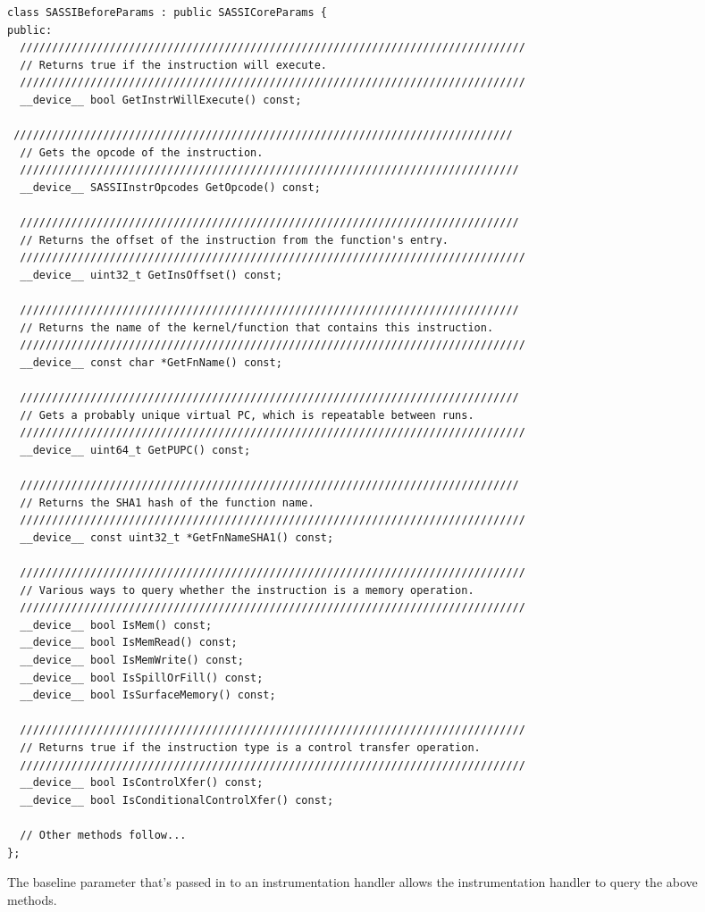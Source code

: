 \begin{figure*}
\center
\begin{lstlisting}
class SASSIBeforeParams : public SASSICoreParams {
public:
  ///////////////////////////////////////////////////////////////////////////////
  // Returns true if the instruction will execute.
  ///////////////////////////////////////////////////////////////////////////////
  __device__ bool GetInstrWillExecute() const;

 //////////////////////////////////////////////////////////////////////////////
  // Gets the opcode of the instruction.
  //////////////////////////////////////////////////////////////////////////////
  __device__ SASSIInstrOpcodes GetOpcode() const;

  //////////////////////////////////////////////////////////////////////////////
  // Returns the offset of the instruction from the function's entry.
  ///////////////////////////////////////////////////////////////////////////////
  __device__ uint32_t GetInsOffset() const;

  //////////////////////////////////////////////////////////////////////////////
  // Returns the name of the kernel/function that contains this instruction.
  ///////////////////////////////////////////////////////////////////////////////
  __device__ const char *GetFnName() const;

  //////////////////////////////////////////////////////////////////////////////
  // Gets a probably unique virtual PC, which is repeatable between runs.
  ///////////////////////////////////////////////////////////////////////////////
  __device__ uint64_t GetPUPC() const;

  //////////////////////////////////////////////////////////////////////////////
  // Returns the SHA1 hash of the function name.
  ///////////////////////////////////////////////////////////////////////////////
  __device__ const uint32_t *GetFnNameSHA1() const;

  ///////////////////////////////////////////////////////////////////////////////
  // Various ways to query whether the instruction is a memory operation.
  ///////////////////////////////////////////////////////////////////////////////
  __device__ bool IsMem() const;
  __device__ bool IsMemRead() const;
  __device__ bool IsMemWrite() const;
  __device__ bool IsSpillOrFill() const;
  __device__ bool IsSurfaceMemory() const;

  ///////////////////////////////////////////////////////////////////////////////
  // Returns true if the instruction type is a control transfer operation.
  ///////////////////////////////////////////////////////////////////////////////
  __device__ bool IsControlXfer() const;
  __device__ bool IsConditionalControlXfer() const;

  // Other methods follow...
};
\end{lstlisting}
\caption{The baseline parameter that's passed in to an instrumentation
  handler allows the instrumentation handler to query the above methods.} 
\label{fig:before-args}
\end{figure*}

